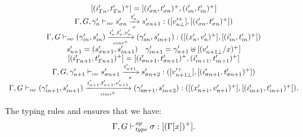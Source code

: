 \begin{skippableproof}
\begin{itemize}
\begin{equation*}
\begin{array}{c}
                      { [(i'_{Tn}, t'_{Tn})^+] = [(i'_{\sigma n}, t'_{\sigma n})^+, (i'_{in}, t'_{in})^+] }                                                       \\
                      \Gamma, G, \gamma'_n \vdash_{\textnormal{\tiny\textsc{frp}}} s'_{\sigma n} \xrightarrow[\mbox{\tiny\ensuremath{\sigma}}]{t'_n} s'_{\sigma n+1}: ([v_{n\bot}^{\prime+}], [(i'_{\sigma n}, t'_{\sigma n})^+])                 \\
                      \Gamma, G \vdash_{\textnormal{\tiny\textsc{frp}}} (\gamma'_{in}, s'_{in}) \xrightarrow[\mbox{\tiny\ensuremath{stmt^+}}]{i'_n, t'_n, v'_n} (\gamma'_{on}, s'_{in+1}): ([(x'_n, v'_n)^+], [(i'_{in}, t'_{in})^+])                  \\
                      s'_{n+1} = (s'_{\sigma n+1}, s'_{in+1})                                                                                                     \quad
                      \gamma'_{in+1} = \gamma'_{n+1} \uplus [(v'_{n+1\bot}/x)^+]                                                                              \\
                      { [(i'_{Tn+1}, t'_{Tn+1})^+] = [(i'_{\sigma n+1}, t'_{\sigma n+1})^+, (i'_{in+1}, t'_{in+1})^+] }                                           \\
                      \Gamma, G, \gamma'_{n+1} \vdash_{\textnormal{\tiny\textsc{frp}}} s'_{\sigma n+1} \xrightarrow[\mbox{\tiny\ensuremath{\sigma}}]{t'_{n+1}} s'_{\sigma n+2}: ([v_{n+1\bot}^{\prime+}], [(i'_{\sigma n+1}, t'_{\sigma n+1})^+]) \\
                      \Gamma, G \vdash_{\textnormal{\tiny\textsc{frp}}} (\gamma'_{in+1}, s'_{in+1}) \xrightarrow[\mbox{\tiny\ensuremath{stmt^+}}]{i'_{n+1}, t'_{n+1}, v'_{n+1}} (\gamma'_{on+1}, s'_{in+2}): ([(x'_{n+1}, v'_{n+1})^+], [(i'_{in+1}, t'_{in+1})^+]).
                  \end{array}
              \end{equation*}

              The typing rules  and
               ensures that we have:
              \begin{equation*}
                  \Gamma, G \vdash_{\textit{type}}^{\textit{op}} \sigma: [(\Gamma[x])^+].
              \end{equation*}


\end{itemize}
\end{skippableproof}
